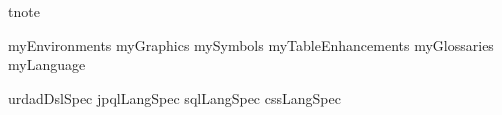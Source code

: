 

\newif\ifslides
\slidesfalse

\usepackage{xcolor}

\usepackage{hyperref}

\usepackage{textcomp}

\usepackage{geometry}


{tnote}

{myEnvironments}
{myGraphics}
{mySymbols}
{myTableEnhancements}
{myGlossaries}
{myLanguage}

{urdadDslSpec}
{jpqlLangSpec}
{sqlLangSpec}
{cssLangSpec}

